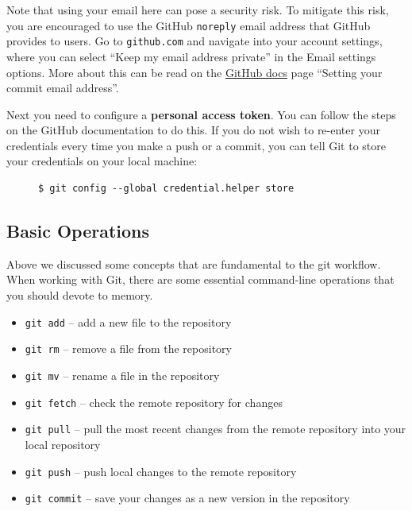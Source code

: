 \documentclass{tufte-book}
\begin{document}
Note that using your email here can pose a security risk. To mitigate this risk, you are encouraged to use the GitHub \verb|noreply| email address that GitHub provides to users. Go to \texttt{github.com} and navigate into your account settings, where you can select ``Keep my email address private'' in the Email settings options. More about this can be read on the \href{https://docs.github.com/en/account-and-profile/setting-up-and-managing-your-personal-account-on-github/managing-email-preferences/setting-your-commit-email-address}{GitHub docs} page ``Setting your commit email address''.

Next you need to configure a \textbf{personal access token}. You can follow the steps on the GitHub documentation to do this. If you do not wish to re-enter your credentials every time you make a push or a commit, you can tell Git to store your credentials on your local machine:

\begin{figure}
\begin{lstlisting}[backgroundcolor=\color{lightgray}]
$ git config --global credential.helper store
\end{lstlisting}
\end{figure}

\subsection{Basic Operations}\label{subsec:basic-ops} %

Above we discussed some concepts that are fundamental to the git workflow. When working with Git, there are some essential command-line operations that you should devote to memory. 

\begin{itemize}
    \item \verb|git add| --  add a new file to the repository
    \item \verb|git rm| -- remove a file from the repository
    \item \verb|git mv| -- rename a file in the repository
    \item \verb|git fetch| -- check the remote repository for changes
    \item \verb|git pull| -- pull the most recent changes from the remote repository into your local repository
    \item \verb|git push| -- push local changes to the remote repository
    \item \verb|git commit| -- save your changes as a new version in the repository
\end{itemize}
\end{document}
